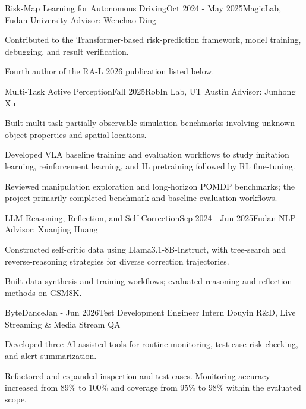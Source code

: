 \documentclass[10pt,a4paper]{article}
\begin{document}
\begin{cventry}{Risk-Map Learning for Autonomous Driving}{Oct 2024 - May 2025}{MagicLab, Fudan University \textbar{} Advisor: Wenchao Ding}
\begin{cvitems}
\item Contributed to the Transformer-based risk-prediction framework, model training, debugging, and result verification.
\item Fourth author of the RA-L 2026 publication listed below.
\end{cvitems}
\end{cventry}

\begin{cventry}{Multi-Task Active Perception}{Fall 2025}{RobIn Lab, UT Austin \textbar{} Advisor: Junhong Xu}
\begin{cvitems}
\item Built multi-task partially observable simulation benchmarks involving unknown object properties and spatial locations.
\item Developed VLA baseline training and evaluation workflows to study imitation learning, reinforcement learning, and IL pretraining followed by RL fine-tuning.
\item Reviewed manipulation exploration and long-horizon POMDP benchmarks; the project primarily completed benchmark and baseline evaluation workflows.
\end{cvitems}
\end{cventry}

\begin{cventry}{LLM Reasoning, Reflection, and Self-Correction}{Sep 2024 - Jun 2025}{Fudan NLP \textbar{} Advisor: Xuanjing Huang}
\begin{cvitems}
\item Constructed self-critic data using Llama3.1-8B-Instruct, with tree-search and reverse-reasoning strategies for diverse correction trajectories.
\item Built data synthesis and training workflows; evaluated reasoning and reflection methods on GSM8K.
\end{cvitems}
\end{cventry}



\newpage
{}
\begin{cventry}{ByteDance}{Jan - Jun 2026}{Test Development Engineer Intern \textbar{} Douyin R\&D, Live Streaming \& Media Stream QA}
\begin{cvitems}
\item Developed three AI-assisted tools for routine monitoring, test-case risk checking, and alert summarization.
\item Refactored and expanded inspection and test cases. Monitoring accuracy increased from 89\% to 100\% and coverage from 95\% to 98\% within the evaluated scope.
\end{cvitems}
\end{cventry}
\end{document}
